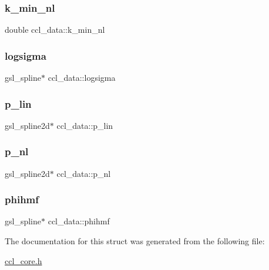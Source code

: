 \subsubsection{\texorpdfstring{k\+\_\+min\+\_\+nl}{k\_min\_nl}}
{\footnotesize\ttfamily double ccl\+\_\+data\+::k\+\_\+min\+\_\+nl}

\mbox{\label{structccl__data_a8b877a586de0aa78c7585338730b3139}} 
\subsubsection{\texorpdfstring{logsigma}{logsigma}}
{\footnotesize\ttfamily gsl\+\_\+spline$\ast$ ccl\+\_\+data\+::logsigma}

\mbox{\label{structccl__data_aa965346f6aa1fe399a7a0d759fb85312}} 
\subsubsection{\texorpdfstring{p\+\_\+lin}{p\_lin}}
{\footnotesize\ttfamily gsl\+\_\+spline2d$\ast$ ccl\+\_\+data\+::p\+\_\+lin}

\mbox{\label{structccl__data_ad55e7ec9ee6a6d8ad95b3c9eb1eef92b}} 
\subsubsection{\texorpdfstring{p\+\_\+nl}{p\_nl}}
{\footnotesize\ttfamily gsl\+\_\+spline2d$\ast$ ccl\+\_\+data\+::p\+\_\+nl}

\mbox{\label{structccl__data_a6417dfa54222033c8c229d3ca5e0866e}} 
\subsubsection{\texorpdfstring{phihmf}{phihmf}}
{\footnotesize\ttfamily gsl\+\_\+spline$\ast$ ccl\+\_\+data\+::phihmf}



The documentation for this struct was generated from the following file\+:\begin{DoxyCompactItemize}
\item 
\mbox{\hyperlink{ccl__core_8h}{ccl\+\_\+core.\+h}}\end{DoxyCompactItemize}
